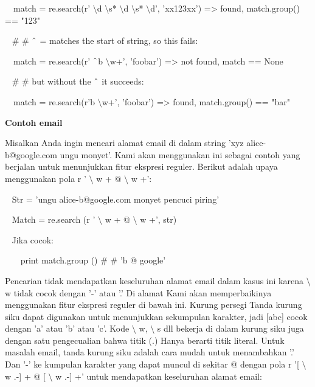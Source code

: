 \noindent 
~~match = re.search(r' $  \setminus  $d $  \setminus  $s* $  \setminus  $d $  \setminus  $s* $  \setminus  $d', 'xx123xx') =>  found, match.group() == "123" \par
\vspace{12pt}
\noindent 
~  $  \#  $ $  \#  $  $  \string^  $ = matches the start of string, so this fails: \par
\noindent 
~~match = re.search(r' $  \string^  $b $  \setminus  $w+', 'foobar') =>  not found, match == None \par
\noindent 
~  $  \#  $ $  \#  $ but without the  $  \string^  $ it succeeds: \par
\noindent 
~~match = re.search(r'b $  \setminus  $w+', 'foobar') =>  found, match.group() == "bar" \par
\vspace{12pt}
\vspace{12pt}
\noindent 
{\fontsize{14pt}{14pt}\selectfont \textbf{Contoh email} \\} \par
Misalkan Anda ingin mencari alamat email di dalam string 'xyz alice-b@google.com ungu monyet'. Kami akan menggunakan ini sebagai contoh yang berjalan untuk menunjukkan fitur ekspresi reguler. Berikut adalah upaya menggunakan pola r ' $  \setminus  $ w + @  $  \setminus  $ w +': \par
\vspace{12pt}
\noindent 
~ Str = 'ungu alice-b@google.com monyet pencuci piring' \par
\noindent 
~ Match = re.search (r ' $  \setminus  $ w + @  $  \setminus  $ w +', str) \par
\noindent 
~ Jika cocok: \par
\noindent 
~~~ print match.group ()  $  \#  $ $  \#  $ 'b @ google' \par
\vspace{12pt}
Pencarian tidak mendapatkan keseluruhan alamat email dalam kasus ini karena  $  \setminus  $ w tidak cocok dengan '-' atau '.' Di alamat Kami akan memperbaikinya menggunakan fitur ekspresi reguler di bawah ini. Kurung persegi Tanda kurung siku dapat digunakan untuk menunjukkan sekumpulan karakter, jadi [abc] cocok dengan 'a' atau 'b' atau 'c'. Kode  $  \setminus  $ w,  $  \setminus  $ s dll bekerja di dalam kurung siku juga dengan satu pengecualian bahwa titik (.) Hanya berarti titik literal. Untuk masalah email, tanda kurung siku adalah cara mudah untuk menambahkan '.' Dan '-' ke kumpulan karakter yang dapat muncul di sekitar @ dengan pola r '[ $  \setminus  $ w .-] + @ [ $  \setminus  $ w .-] +' untuk mendapatkan keseluruhan alamat email: \par
